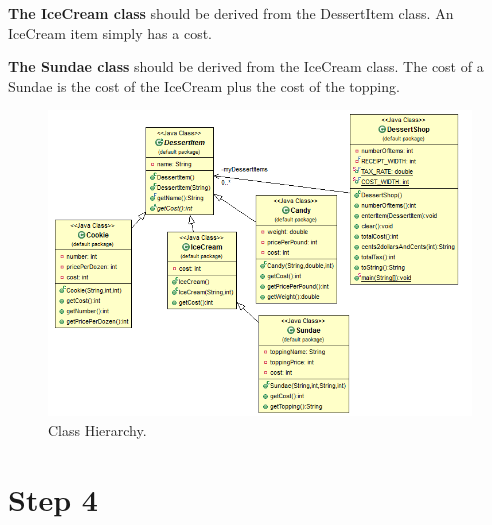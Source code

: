 \textbf{The IceCream class} should be derived from the DessertItem class. An IceCream item simply has a cost.

\textbf{The Sundae class} should be derived from the IceCream class. The cost of a Sundae is the cost of the IceCream plus
the cost of the topping.

	\begin{figure}[!ht]
		\begin{center}
		 	\includegraphics[width=\textwidth]{figures/cti.png}
 
		\end{center}
		\caption{Class Hierarchy.}
		\label{fig:cti}
	\end{figure}

\section{Step 4}








